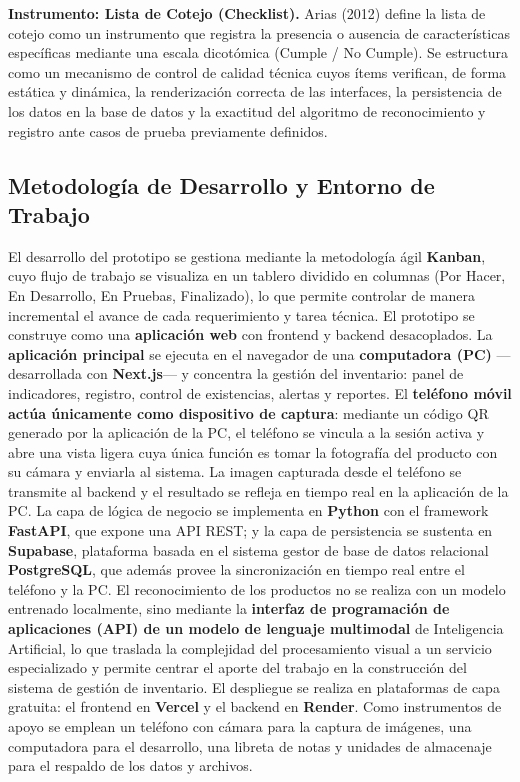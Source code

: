 \documentclass[12pt, letterpaper]{report}
\begin{document}
\noindent\textbf{Instrumento: Lista de Cotejo (Checklist).} Arias
(2012) define la lista de cotejo como un instrumento que registra la
presencia o ausencia de características específicas mediante una escala
dicotómica (Cumple / No Cumple). Se estructura como un mecanismo de
control de calidad técnica cuyos ítems verifican, de forma estática y
dinámica, la renderización correcta de las interfaces, la persistencia
de los datos en la base de datos y la exactitud del algoritmo de
reconocimiento y registro ante casos de prueba previamente definidos.

\subsection{Metodología de Desarrollo y Entorno de Trabajo}

El desarrollo del prototipo se gestiona mediante la metodología ágil
\textbf{Kanban}, cuyo flujo de trabajo se visualiza en un tablero
dividido en columnas (Por Hacer, En Desarrollo, En Pruebas, Finalizado),
lo que permite controlar de manera incremental el avance de cada
requerimiento y tarea técnica. El prototipo se construye como una
\textbf{aplicación web} con frontend y backend desacoplados. La
\textbf{aplicación principal} se ejecuta en el navegador de una
\textbf{computadora (PC)} ---desarrollada con \textbf{Next.js}--- y
concentra la gestión del inventario: panel de indicadores, registro,
control de existencias, alertas y reportes. El \textbf{teléfono móvil
actúa únicamente como dispositivo de captura}: mediante un código QR
generado por la aplicación de la PC, el teléfono se vincula a la sesión
activa y abre una vista ligera cuya única función es tomar la fotografía
del producto con su cámara y enviarla al sistema. La imagen capturada
desde el teléfono se transmite al backend y el resultado se refleja en
tiempo real en la aplicación de la PC. La capa de lógica de negocio se
implementa en \textbf{Python} con el framework \textbf{FastAPI}, que
expone una API REST; y la capa de persistencia se sustenta en
\textbf{Supabase}, plataforma basada en el sistema gestor de base de
datos relacional \textbf{PostgreSQL}, que además provee la
sincronización en tiempo real entre el teléfono y la PC. El
reconocimiento de los productos no se realiza con un modelo entrenado
localmente, sino mediante la \textbf{interfaz de programación de
aplicaciones (API) de un modelo de lenguaje multimodal} de Inteligencia
Artificial, lo que traslada la complejidad del procesamiento visual a un
servicio especializado y permite centrar el aporte del trabajo en la
construcción del sistema de gestión de inventario. El despliegue se
realiza en plataformas de capa gratuita: el frontend en \textbf{Vercel}
y el backend en \textbf{Render}. Como instrumentos de apoyo se emplean
un teléfono con cámara para la captura de imágenes, una computadora para
el desarrollo, una libreta de notas y unidades de almacenaje para el
respaldo de los datos y archivos.
\end{document}
